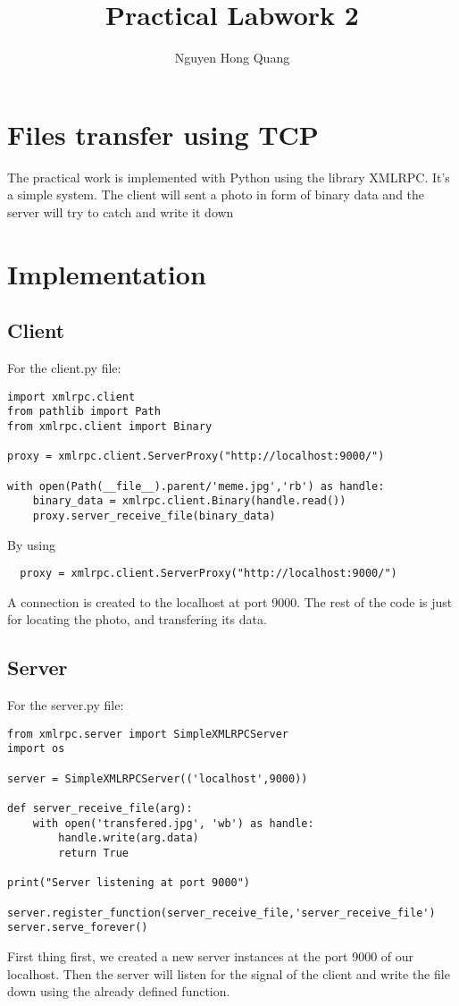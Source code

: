 \documentclass{article}
\title{Practical Labwork 2}
\author{Nguyen Hong Quang}
\begin{document}
\maketitle

\section{Files transfer using TCP}
The practical work is implemented with Python using the library XMLRPC. It's a simple system.
The client will sent a photo in form of binary data and the server will try to catch and write it down 

\section{Implementation}
\subsection{Client}
For the client.py file:
\begin{verbatim}
import xmlrpc.client
from pathlib import Path
from xmlrpc.client import Binary 

proxy = xmlrpc.client.ServerProxy("http://localhost:9000/")

with open(Path(__file__).parent/'meme.jpg','rb') as handle:
    binary_data = xmlrpc.client.Binary(handle.read())
    proxy.server_receive_file(binary_data)
\end{verbatim}

By using 
\begin{verbatim}
  proxy = xmlrpc.client.ServerProxy("http://localhost:9000/")
\end{verbatim}
A connection is created to the localhost at port 9000. The rest of the code is just for locating the photo, and transfering its data.
\subsection{Server}
For the server.py file: 
\begin{verbatim}
from xmlrpc.server import SimpleXMLRPCServer
import os 

server = SimpleXMLRPCServer(('localhost',9000))

def server_receive_file(arg):
    with open('transfered.jpg', 'wb') as handle: 
        handle.write(arg.data)
        return True

print("Server listening at port 9000")

server.register_function(server_receive_file,'server_receive_file')
server.serve_forever()
\end{verbatim}
First thing first, we created a new server instances at the port 9000 of our localhost. Then the server will listen for the signal of the client and write the file down using the already defined function. 
\end{document}
